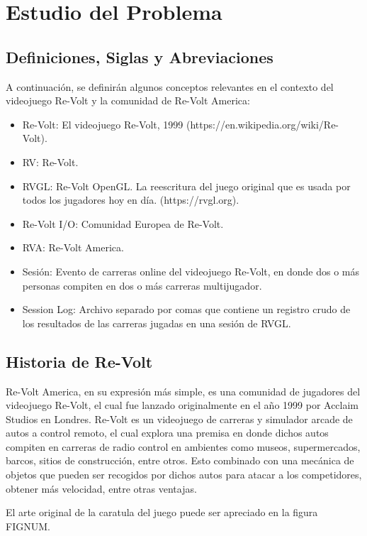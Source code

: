 \chapter{Estudio del Problema}

\section{Definiciones, Siglas y Abreviaciones}
A continuación, se definirán algunos conceptos relevantes en el contexto del videojuego Re-Volt y la comunidad de Re-Volt America:

\begin{itemize}
	\item Re-Volt: El videojuego Re-Volt, 1999 (https://en.wikipedia.org/wiki/Re-Volt).
	\item RV: Re-Volt.
	\item RVGL: Re-Volt OpenGL. La reescritura del juego original que es usada por todos los jugadores hoy en día. (https://rvgl.org).
	\item Re-Volt I/O: Comunidad Europea de Re-Volt.
	\item RVA: Re-Volt America.
	\item Sesión: Evento de carreras online del videojuego Re-Volt, en donde dos o más personas compiten en dos o más carreras multijugador.
	\item Session Log: Archivo separado por comas que contiene un registro crudo de los resultados de las carreras jugadas en una sesión de RVGL.
\end{itemize}

\section{Historia de Re-Volt}
Re-Volt America, en su expresión más simple, es una comunidad de jugadores del videojuego Re-Volt, el cual fue lanzado originalmente en el año 1999 por Acclaim Studios en Londres. Re-Volt es un videojuego de carreras y simulador arcade de autos a control remoto, el cual explora una premisa en donde dichos autos compiten en carreras de radio control en ambientes como museos, supermercados, barcos, sitios de construcción, entre otros. Esto combinado con una mecánica de objetos que pueden ser recogidos por dichos autos para atacar a los competidores, obtener más velocidad, entre otras ventajas.

El arte original de la caratula del juego puede ser apreciado en la figura FIGNUM.

